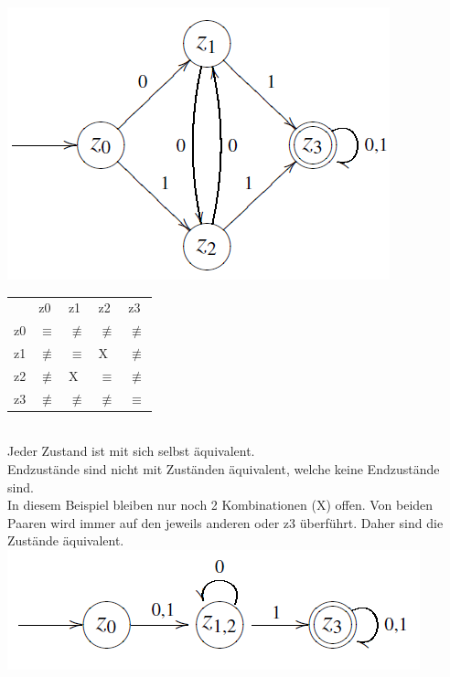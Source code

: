 \documentclass[a4paper]{article}
\begin{document}
	\begin{fmerke}[Beispiel]
	\includegraphics[scale=0.7]{minimal_dea.png}
	\begin{tabular}{lllll}
		& z0 & z1 & z2 & z3 \\
		z0 & $\equiv$ & $\not\equiv$ & $\not\equiv$ & $\not\equiv$ \\
		z1 & $\not\equiv$ & $\equiv$ & X & $\not\equiv$ \\
		z2 & $\not\equiv$ & X & $\equiv$ & $\not\equiv$ \\
		z3 & $\not\equiv$ & $\not\equiv$ & $\not\equiv$ & $\equiv$
	\end{tabular} \\
	Jeder Zustand ist mit sich selbst äquivalent. \\
	Endzustände sind nicht mit Zuständen äquivalent, welche keine Endzustände sind. \\
	In diesem Beispiel bleiben nur noch 2 Kombinationen (X) offen. Von beiden Paaren wird immer auf den jeweils anderen oder z3 überführt. Daher sind die Zustände äquivalent. \\
	\includegraphics[scale=0.7]{minimal_dea_2.png}
	\end{fmerke}
	
\end{document}
